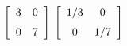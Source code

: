 {$\left[ \begin {array}{cc} 3&0\\\noalign{\medskip}0&7\end {array}
 \right] $
 }
{$\left[ \begin {array}{cc} 1/3&0\\\noalign{\medskip}0&1/7\end {array}
 \right]$ }
